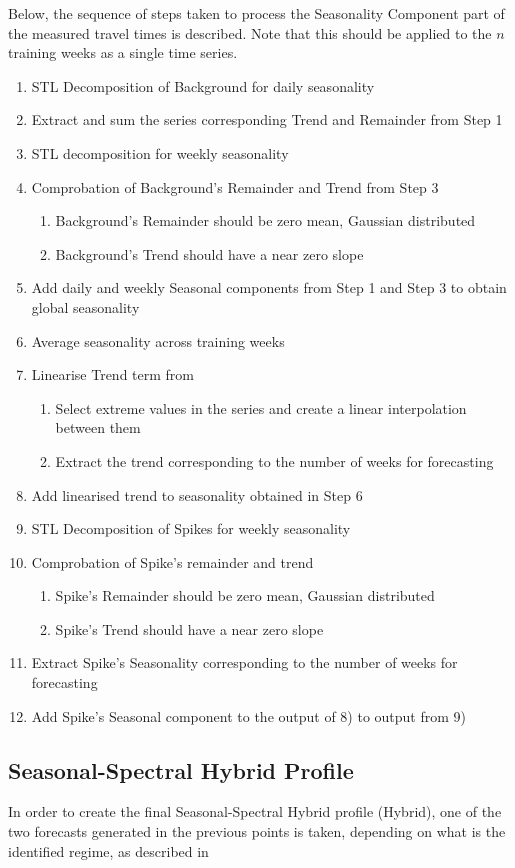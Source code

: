 \documentclass[conference, letterpaper]{IEEEtran}
\begin{document}
Below, the sequence of steps taken to process the Seasonality Component part of the measured travel times is described. 
Note that this should be applied to the $n$ training weeks as a single time series.
\begin{enumerate}
	\item STL Decomposition of Background for daily seasonality
	\item Extract and sum the series corresponding Trend and Remainder from Step 1
	\item STL decomposition for weekly seasonality
	\item Comprobation of Background's Remainder and Trend from Step 3
	\begin{enumerate}
		\item Background's Remainder should be zero mean, Gaussian distributed
		\item Background's Trend should have a near zero slope
	\end{enumerate}
	\item Add daily and weekly Seasonal components from Step 1 and Step 3 to obtain global seasonality
	\item Average seasonality across training weeks
	\item Linearise Trend term from
	\begin{enumerate}
		\item Select extreme values in the series and create a linear interpolation between them
		\item Extract the trend corresponding to the number of weeks for forecasting
	\end{enumerate}
	\item Add linearised trend to seasonality obtained in Step 6
	\item STL Decomposition of Spikes for weekly seasonality
	\item Comprobation of Spike's remainder and trend
	\begin{enumerate}
		\item Spike's Remainder should be zero mean, Gaussian distributed
		\item Spike's Trend should have a near zero slope
	\end{enumerate}
	\item Extract Spike's Seasonality corresponding to the number of weeks for forecasting
	\item Add Spike's Seasonal component to the output of 8) to output from 9)
\end{enumerate}
\subsection{Seasonal-Spectral Hybrid Profile}
In order to create the final Seasonal-Spectral Hybrid profile (Hybrid), one of the two forecasts generated in the previous points is taken, depending on what is the identified regime, as described in 
\end{document}
